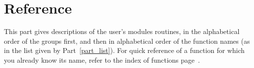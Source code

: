 %
%


\part{Reference}

This part gives descriptions of the user's modules routines, in the alphabetical order
of the groups first, and then in alphabetical order of the function names (as in the
list given by Part~\ref{part_list}). For quick reference of a function for which you
already know its name, refer to the index of functions page~\pageref{print_index}.

\newpage

